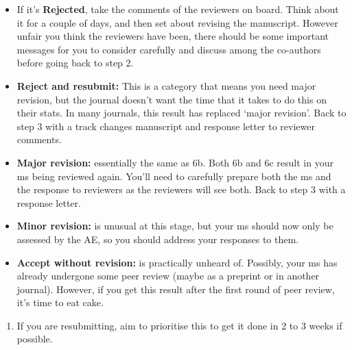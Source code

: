 \documentclass[
]{krantz}
\providecommand{\tightlist}{%
  \setlength{\itemsep}{0pt}\setlength{\parskip}{0pt}}
\begin{document}
\begin{itemize}
\tightlist
\item
  If it's \textbf{Rejected}, take the comments of the reviewers on board. Think about it for a couple of days, and then set about revising the manuscript. However unfair you think the reviewers have been, there should be some important messages for you to consider carefully and discuss among the co-authors before going back to step 2.
\item
  \textbf{Reject and resubmit:} This is a category that means you need major revision, but the journal doesn't want the time that it takes to do this on their stats. In many journals, this result has replaced `major revision'. Back to step 3 with a track changes manuscript and response letter to reviewer comments.
\item
  \textbf{Major revision:} essentially the same as 6b. Both 6b and 6c result in your ms being reviewed again. You'll need to carefully prepare both the ms and the response to reviewers as the reviewers will see both. Back to step 3 with a response letter.
\item
  \textbf{Minor revision:} is unusual at this stage, but your ms should now only be assessed by the AE, so you should address your responses to them.
\item
  \textbf{Accept without revision:} is practically unheard of. Possibly, your ms has already undergone some peer review (maybe as a preprint or in another journal). However, if you get this result after the first round of peer review, it's time to eat cake.
\end{itemize}

\begin{enumerate}
\def\labelenumi{\arabic{enumi}.}
\tightlist
\item
  If you are resubmitting, aim to prioritise this to get it done in 2 to 3 weeks if possible.
\end{enumerate}
\end{document}
